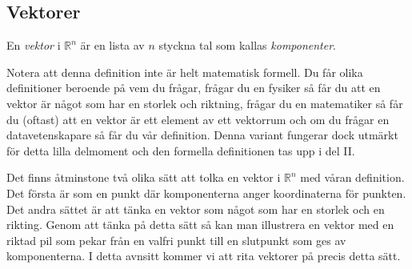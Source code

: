 \documentclass{article}
\theoremstyle{definition}
\begin{document}
\subsection{Vektorer}
\begin{mydef}{}{}
  En \textit{vektor} i $\mathbb{R}^n$ är en lista av $n$ styckna tal som kallas \textit{komponenter}. 
\end{mydef}
Notera att denna definition inte är helt matematisk formell. Du får olika definitioner beroende på vem du frågar, frågar du en fysiker så får du att en vektor
är något som har en storlek och riktning, frågar du en matematiker så får du (oftast) att en vektor är ett element av ett 
vektorrum och om du frågar en datavetenskapare så får du vår 
definition. Denna variant fungerar dock utmärkt för detta lilla delmoment och den formella definitionen tas upp i del II. 

Det finns åtminstone två olika sätt att tolka en vektor i $\mathbb{R}^n$ med våran definition. Det första är som en 
punkt där komponenterna anger koordinaterna för punkten. Det andra sättet är att tänka en vektor 
som något som har en storlek och en rikting. Genom att tänka på detta sätt så kan man illustrera en 
vektor med en riktad pil som pekar från en valfri punkt till en slutpunkt som ges av komponenterna.
I detta avnsitt kommer vi att rita vektorer på precis detta sätt. 
\end{document}
